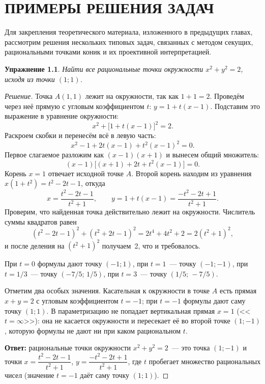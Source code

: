 \documentclass[a4paper,14pt]{extreport}
\theoremstyle{definition}
\newtheorem{exer}[thm]{Упражнение}
\newcommand{\answer}[1]{\par\medskip\noindent\textbf{Ответ:} #1}
\begin{document}
\chapter{ПРИМЕРЫ РЕШЕНИЯ ЗАДАЧ}

Для закрепления теоретического материала, изложенного в предыдущих главах,
рассмотрим решения нескольких типовых задач, связанных с методом секущих,
рациональными точками коник и их проективной интерпретацией.

\begin{exer}\label{ex:two}
\itshape Найти все рациональные точки окружности $x^2+y^2=2$, исходя из точки
$(1;1)$.
\end{exer}

\begin{proof}[Решение]
\normalfont
Точка $A(1,1)$ лежит на окружности, так как $1+1=2$. Проведём через неё прямую
с угловым коэффициентом $t$: $y=1+t(x-1)$. Подставим это выражение в уравнение
окружности:
\[
  x^2+\bigl[1+t(x-1)\bigr]^2=2 .
\]
Раскроем скобки и перенесём всё в левую часть:
\[
  x^2-1+2t(x-1)+t^2(x-1)^2=0 .
\]
Первое слагаемое разложим как $(x-1)(x+1)$ и вынесем общий множитель:
\[
  (x-1)\bigl[(x+1)+2t+t^2(x-1)\bigr]=0 .
\]
Корень $x=1$ отвечает исходной точке $A$. Второй корень находим из уравнения
$x(1+t^2)=t^2-2t-1$, откуда
\[
  x=\frac{t^2-2t-1}{t^2+1},\qquad
  y=1+t(x-1)=\frac{-t^2-2t+1}{t^2+1}.
\]
Проверим, что найденная точка действительно лежит на окружности. Числитель
суммы квадратов равен
\[
  (t^2-2t-1)^2+(t^2+2t-1)^2=2t^4+4t^2+2=2(t^2+1)^2,
\]
и после деления на $(t^2+1)^2$ получаем~2, что и требовалось.

При $t=0$ формулы дают точку $(-1;1)$, при $t=1$~--- точку $(-1;-1)$, при
$t=1/3$~--- точку $(-7/5;\,1/5)$, при $t=3$~--- точку $(1/5;\,-7/5)$.

Отметим два особых значения. Касательная к окружности в точке $A$ есть прямая
$x+y=2$ с угловым коэффициентом $t=-1$; при $t=-1$ формулы дают саму точку
$(1;1)$. В параметризацию не попадает вертикальная прямая $x=1$ (<<$t=\infty$>>):
она не касается окружности и пересекает её во второй точке $(1;-1)$, которую
формулы не дают ни при каком рациональном $t$.

\answer{рациональные точки окружности $x^2+y^2=2$~--- это точка $(1;-1)$ и точки
$x=\dfrac{t^2-2t-1}{t^2+1}$, $y=\dfrac{-t^2-2t+1}{t^2+1}$, где $t$ пробегает
множество рациональных чисел (значение $t=-1$ даёт саму точку $(1;1)$).}
\end{proof}
\end{document}
